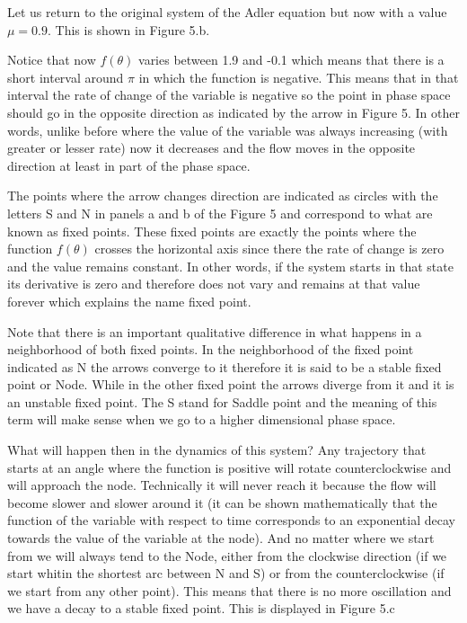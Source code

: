 \documentclass{article}
\begin{document}
Let us return to the original system of the Adler equation but now with a value $\mu=0.9$. This is shown in Figure 5.b. 

Notice that now $f(\theta)$ varies between 1.9 and -0.1 which means that there is a short interval around $\pi$ in which the function is negative. 
This means that in that interval the rate of change of the variable is negative so the point in phase space should go in the opposite direction as indicated by the arrow in Figure 5. 
In other words, unlike before where the value of the variable was always increasing (with greater or lesser rate) now it decreases and the flow moves in the opposite direction at least in part of the phase space.  

The points where the arrow changes direction are indicated as circles with the letters S and N in panels a and b of the Figure 5 and correspond to what are known as fixed points. These fixed points are exactly the points where the function $f(\theta)$ crosses the horizontal axis since there the rate of change is zero and the value remains constant. 
In other words, if the system starts in that state its derivative is zero and therefore does not vary and remains at that value forever which explains the name fixed point. 

Note that there is an important qualitative difference in what happens in a neighborhood of both fixed points. 
In the neighborhood of the fixed point indicated as N the arrows converge to it therefore it is said to be a stable fixed point or Node.  
While in the other fixed point the arrows diverge from it and it is an unstable fixed point. The S stand for Saddle point and the meaning of this term will make sense when we go to a higher dimensional phase space.

What will happen then in the dynamics of this system? 
Any trajectory that starts at an angle where the function is positive will rotate counterclockwise and will approach the node. 
Technically it will never reach it because the flow will become slower and slower around it (it can be shown mathematically that the function of the variable with respect to time corresponds to an exponential decay towards the value of the variable at the node). 
And no matter where we start from we will always tend to the Node, either from the clockwise direction (if we start whitin the shortest arc between N and S) or from the counterclockwise (if we start from any other point). 
This means that there is no more oscillation and we have a decay to a stable fixed point.
This is displayed in Figure 5.c
\end{document}
